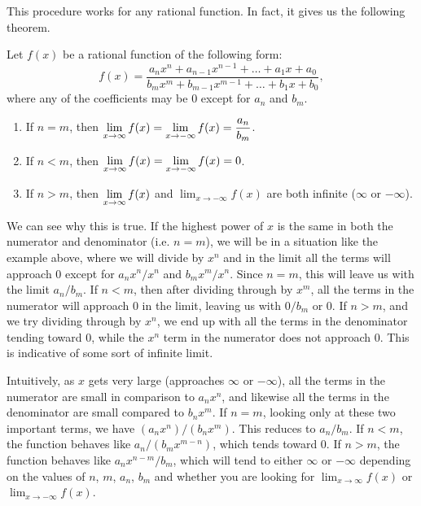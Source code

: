 This procedure works for any rational function.  In fact, it gives us the following theorem.

\addtocounter{figure}{1}
{Let $f(x)$ be a rational function of the following form:
$$f(x)=\frac{a_nx^n + a_{n-1}x^{n-1}+\dots + a_1x + a_0}{b_mx^m + b_{m-1}x^{m-1} + \dots + b_1x + b_0},$$
where any of the coefficients may be 0 except for $a_n$ and $b_m$.
\begin{enumerate}
\item If $n=m$, then $\displaystyle\lim_{x\rightarrow\infty} f(x) = \lim_{x\rightarrow-\infty} f(x) = \frac{a_n}{b_m}$.
\item If $n<m$, then $\displaystyle\lim_{x\rightarrow\infty} f(x) = \lim_{x\rightarrow-\infty} f(x) = 0$.
\item If $n>m$, then $\displaystyle\lim_{x\rightarrow\infty} f(x)$ and $\lim_{x\rightarrow-\infty} f(x)$ are both infinite ($\infty$ or $-\infty$).
\end{enumerate}
}

We can see why this is true.  If the highest power of $x$ is the same in both the numerator and denominator (i.e. $n=m$), we will be in a situation like the example above, where we will divide by $x^n$ and in the limit all the terms will approach 0 except for $a_nx^n/x^n$ and $b_mx^m/x^n$. Since $n=m$, this will leave us with the limit $a_n/b_m$.  If $n<m$, then after dividing through by $x^m$, all the terms in the numerator will approach 0 in the limit, leaving us with $0/b_m$ or 0.  If $n>m$, and we try dividing through by $x^n$, we end up with all the terms in the denominator tending toward 0, while the $x^n$ term in the numerator does not approach 0.  This is indicative of some sort of infinite limit.

Intuitively, as $x$ gets very large (approaches $\infty$ or $-\infty$), all the terms in the numerator are small in comparison to $a_nx^n$, and likewise all the terms in the denominator are small compared to $b_nx^m$.  If $n=m$, looking only at these two important terms, we have $(a_nx^n)/(b_nx^m)$.  This reduces to $a_n/b_m$.  If $n<m$, the function behaves like $a_n/(b_mx^{m-n})$, which tends toward 0.  If $n>m$, the function behaves like $a_nx^{n-m}/b_m$, which will tend to either $\infty$ or $-\infty$ depending on the values of $n$, $m$, $a_n$, $b_m$ and whether you are looking for $\lim_{x\rightarrow\infty} f(x)$ or $\lim_{x\rightarrow-\infty} f(x)$.


